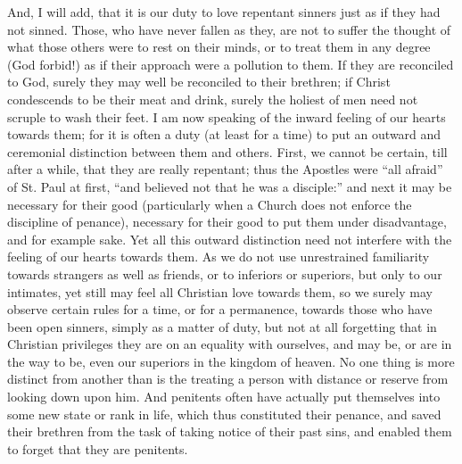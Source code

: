 And, I will add, that it is our duty to love repentant sinners just
as if they had not sinned. Those, who have never fallen as they, are
not to suffer the thought of what those others were to rest on their
minds, or to treat them in any degree (God forbid!) as if their
approach were a pollution to them. If they are reconciled to God,
surely they may well be reconciled to their brethren; if Christ
condescends to be their meat and drink, surely the holiest of men need
not scruple to wash their feet. I am now speaking of the inward
feeling of our hearts towards them; for it is often a duty (at least
for a time) to put an outward and ceremonial distinction between them
and others. First, we cannot be certain, till after a while, that they
are really repentant; thus the Apostles were ``all afraid'' of
St. Paul at first, ``and believed not that he was a
disciple:'' and next it may be necessary for their good
(particularly when a Church does not enforce the discipline of
penance), necessary for their good to put them under disadvantage, and
for example sake. Yet all this outward distinction need not interfere
with the feeling of our hearts towards them. As we do not use
unrestrained familiarity towards strangers as well as friends, or to
inferiors or superiors, but only to our intimates, yet still may feel
all Christian love towards them, so we surely may observe certain
rules for a time, or for a permanence, towards those who have been
open sinners, simply as a matter of duty, but not at all forgetting
that in Christian privileges they are on an equality with ourselves,
and may be, or are in the way to be, even our superiors in the kingdom
of heaven. No one thing is more distinct from another than is the
treating a person with distance or reserve from looking down upon him.
And penitents often have actually put themselves into some new state
or rank in life, which thus constituted their penance, and saved their
brethren from the task of taking notice of their past sins, and
enabled them to forget that they are penitents.


